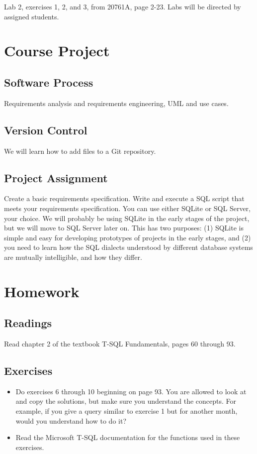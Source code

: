 \documentclass{article}
\begin{document}
Lab 2, exercises 1, 2, and 3, from 20761A, page 2-23. Labs will be directed by assigned students.


    \section{Course Project}


        \subsection{Software Process}

        Requirements analysis and requirements engineering, UML and use cases.
        
        \subsection{Version Control}

        We will learn how to add files to a Git repository.

        \subsection{Project Assignment}

        Create a basic requirements specification. Write and execute a SQL script that meets your requirements specification. You can use either SQLite or SQL Server, your choice. We will probably be using SQLite in the early stages of the project, but we will move to SQL Server later on. This has two purposes: (1) SQLite is simple and easy for developing prototypes of projects in the early stages, and (2) you need to learn how the SQL dialects understood by different database systems are mutually intelligible, and how they differ.

    \section{Homework}


        \subsection{Readings}
         Read chapter 2 of the textbook T-SQL Fundamentals, pages 60 through 93.

        
        \subsection{Exercises}

        \begin{itemize}
        \item Do exercises 6 through 10 beginning on page 93. You are allowed to look at and copy the solutions, but make sure you understand the concepts. For example, if you give a query similar to exercise 1 but for another month, would you understand how to do it?

        \item Read the Microsoft T-SQL documentation for the functions used in these exercises.
        \end{itemize}
\end{document}
